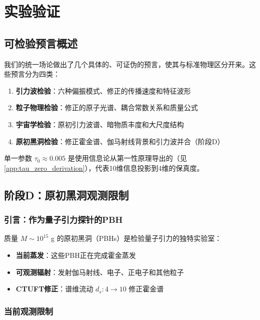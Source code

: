\section{实验验证}
\label{sec:experimental}

\subsection{可检验预言概述}

我们的统一场论做出了几个具体的、可证伪的预言，使其与标准物理区分开来。这些预言分为四类：

\begin{enumerate}
    \item \textbf{引力波检验}：六种偏振模式、修正的传播速度和特征波形
    \item \textbf{粒子物理检验}：修正的原子光谱、耦合常数关系和质量公式
    \item \textbf{宇宙学检验}：原初引力波谱、暗物质丰度和大尺度结构
    \item \textbf{原初黑洞检验}：修正霍金谱、伽马射线背景和引力波并合（阶段D）
\end{enumerate}

单一参数 $\tau_0 \approx 0.005$ 是使用信息论从第一性原理导出的（见 \cref{app:tau_zero_derivation}），代表10维信息投影到4维的保真度。

\subsection{阶段D：原初黑洞观测限制}
\label{subsec:stageD_observations}

\subsubsection{引言：作为量子引力探针的PBH}

质量 $M \sim 10^{15}$ g 的原初黑洞（PBHs）是检验量子引力的独特实验室：
\begin{itemize}
    \item \textbf{当前蒸发}：这些PBH正在完成霍金蒸发
    \item \textbf{可观测辐射}：发射伽马射线、电子、正电子和其他粒子
    \item \textbf{CTUFT修正}：谱维流动 $d_s: 4 \to 10$ 修正霍金谱
\end{itemize}

\subsubsection{当前观测限制}

